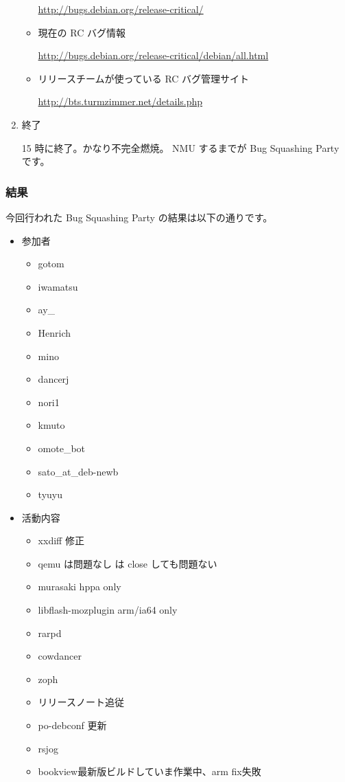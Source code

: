 \documentclass[mingoth,a4paper]{jsarticle}
\begin{document}
\begin{enumerate}
\begin{itemize}
	\url{http://bugs.debian.org/release-critical/}
  \item 現在の RC バグ情報 
	
	\url{http://bugs.debian.org/release-critical/debian/all.html}
  \item リリースチームが使っている RC バグ管理サイト 
	
\url{http://bts.turmzimmer.net/details.php}
 \end{itemize}
\item 終了

 15 時に終了。かなり不完全燃焼。
 NMU するまでが Bug Squashing Party です。

\end{enumerate}

\subsubsection{結果}
 今回行われた Bug Squashing Party の結果は以下の通りです。

\begin{itemize}
 \item 参加者
   \begin{itemize}
   \item gotom
   \item iwamatsu
   \item ay\_
   \item Henrich
   \item mino
   \item dancerj
   \item nori1
   \item kmuto
   \item omote\_bot
   \item sato\_at\_deb-newb
   \item tyuyu
   \end{itemize}

 \item 活動内容
   \begin{itemize}
   \item xxdiff 修正 
   \item qemu は問題なし は close しても問題ない
   \item murasaki  hppa only
   \item libflash-mozplugin  arm/ia64 only
   \item rarpd 
   \item cowdancer 
   \item zoph 
   \item リリースノート追従
   \item po-debconf 更新
   \item rsjog
   \item bookview最新版ビルドしていま作業中、arm fix失敗
   \end{itemize}
\end{itemize}
\end{document}

